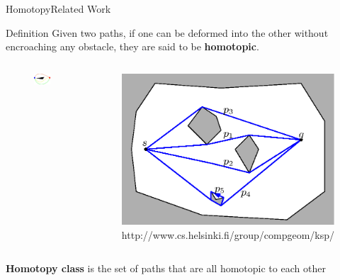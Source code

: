 \begin{frame}{Homotopy}{Related Work}

\begin{block}{Definition}
Given two paths, if one can be deformed into the other without encroaching any obstacle, they are said to be {\bf homotopic}.\footnotemark
\end{block}

\begin{columns}
\begin{figure}
	\centering
	\includegraphics[width=.8\linewidth]{figure/path_homotopy}
\end{figure}

\begin{figure}
	\centering
	\includegraphics[width=.8\linewidth]{figure/path_homotopy_map}
	\caption{\tiny http://www.cs.helsinki.fi/group/compgeom/ksp/}
\end{figure}

\end{columns}

\begin{block}{}
	{\bf Homotopy class} is the set of paths that are all homotopic to each other
\end{block}


\end{frame}

